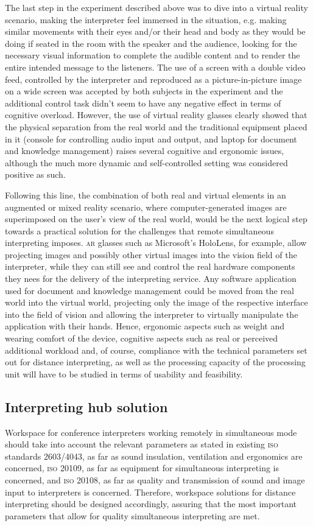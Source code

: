 \documentclass[output=paper]{langsci/langscibook}
\begin{document}
The last step in the experiment described above was to dive into a virtual reality scenario, making the interpreter feel immersed in the situation, e.g. making similar movements with their eyes and/or their head and body as they would be doing if seated in the room with the speaker and the audience, looking for the necessary visual information to complete the audible content and to render the entire intended message to the listeners. The use of a screen with a double video feed, controlled by the interpreter and reproduced as a picture-in-picture image on a wide screen was accepted by both subjects in the experiment and the additional control task didn’t seem to have any negative effect in terms of cognitive overload. However, the use of virtual reality glasses clearly showed that the physical separation from the real world and the traditional equipment placed in it (console for controlling audio input and output, and laptop for document and knowledge management) raises several cognitive and ergonomic issues, although the much more dynamic and self-controlled setting was considered positive as such. 

Following this line, the combination of both real and virtual elements in an augmented or mixed reality scenario, where computer-generated images are superimposed on the user’s view of the real world, would be the next logical step towards a practical solution for the challenges that remote simultaneous interpreting imposes. \textsc{ar} glasses such as Microsoft’s HoloLens, for example, allow projecting images and possibly other virtual images into the vision field of the interpreter, while they can still see and control the real hardware components they nees for the delivery of the interpreting service. Any software application used for document and knowledge management could be moved from the real world into the virtual world, projecting only the image of the respective interface into the field of vision and allowing the interpreter to virtually manipulate the application with their hands. Hence, ergonomic aspects such as weight and wearing comfort of the device, cognitive aspects such as real or perceived additional workload and, of course, compliance with the technical parameters set out for distance interpreting, as well as the processing capacity of the processing unit will have to be studied in terms of usability and feasibility.

\subsection{Interpreting hub solution}
\label{sub:ziegler:6.2}
Workspace for conference interpreters working remotely in simultaneous mode should take into account the relevant parameters as stated in existing \textsc{iso} standards 2603/4043, as far as sound insulation, ventilation and ergonomics are concerned, \textsc{iso} 20109, as far as equipment for simultaneous interpreting is concerned, and \textsc{iso} 20108, as far as quality and transmission of sound and image input to interpreters is concerned. Therefore, workspace solutions for distance interpreting should be designed accordingly, assuring that the most important parameters that allow for quality simultaneous interpreting are met.
\end{document}

